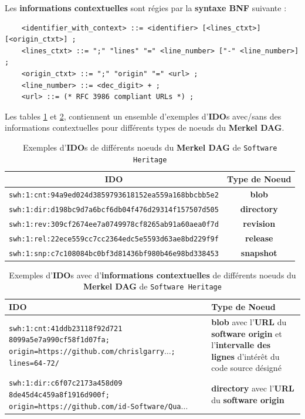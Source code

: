 \documentclass[12pt,a4paper]{report}
\theoremstyle{definition}
\begin{document}
Les \textbf{informations contextuelles} sont régies par la \textbf{syntaxe BNF} suivante :
\begin{verbatim}
	<identifier_with_context> ::= <identifier> [<lines_ctxt>] [<origin_ctxt>] ;
	<lines_ctxt> ::= ";" "lines" "=" <line_number> ["-" <line_number>] ;
	<origin_ctxt> ::= ";" "origin" "=" <url> ;
	<line_number> ::= <dec_digit> + ;
	<url> ::= (* RFC 3986 compliant URLs *) ;
\end{verbatim}

Les tables \ref{tab:IDO_examples} et \ref{tab:IDO_contextual_examples}, contiennent un ensemble d'exemples d'\textbf{IDO}s avec/sans des informations contextuelles pour différents types de noeuds du \textbf{Merkel DAG}.

\begin{table}[!ht]
	\centering
	\begin{tabular}{|c||c|}
		\hline
		\textbf{IDO} & \textbf{Type de Noeud}\\
		\hline
		\texttt{swh:1:cnt:94a9ed024d3859793618152ea559a168bbcbb5e2} & \textbf{blob}\\
		\hline
		\texttt{swh:1:dir:d198bc9d7a6bcf6db04f476d29314f157507d505} & \textbf{directory}\\
		\hline
		\texttt{swh:1:rev:309cf2674ee7a0749978cf8265ab91a60aea0f7d} & \textbf{revision}\\
		\hline
		\texttt{swh:1:rel:22ece559cc7cc2364edc5e5593d63ae8bd229f9f} & \textbf{release}\\
		\hline
		\texttt{swh:1:snp:c7c108084bc0bf3d81436bf980b46e98bd338453} & \textbf{snapshot}\\
		\hline
	\end{tabular}
	\caption{Exemples d'\textbf{IDO}s de différents noeuds du \textbf{Merkel DAG} de \texttt{Software Heritage}}
	\label{tab:IDO_examples}
\end{table}

\begin{table}[!ht]
	\centering
	\begin{tabular}{|p{9cm}||p{6cm}|}
		\hline
		\textbf{IDO} & \textbf{Type de Noeud}\\
		\hline
		\texttt{swh:1:cnt:41ddb23118f92d721 8099a5e7a990cf58f1d07fa; origin=https://github.com/chrislgarry$\dots$; lines=64-72/} & \textbf{blob} avec l'\textbf{URL} du \textbf{software origin} et l'\textbf{intervalle des lignes} d'intérêt du code source désigné\\
		\hline
		\texttt{swh:1:dir:c6f07c2173a458d09 8de45d4c459a8f1916d900f; origin=https://github.com/id-Software/Qua$\dots$} & \textbf{directory} avec l'\textbf{URL} du \textbf{software origin}\\
		\hline
	\end{tabular}
	\caption{Exemples d'\textbf{IDO}s avec d'\textbf{informations contextuelles} de différents noeuds du \textbf{Merkel DAG} de \texttt{Software Heritage}}
	\label{tab:IDO_contextual_examples}
\end{table}
\end{document}
